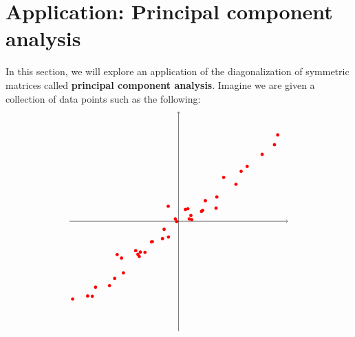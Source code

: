 \section{Application: Principal component analysis}

In this section, we will explore an application of the diagonalization
of symmetric matrices called \textbf{principal component analysis}.
Imagine we are given a collection of data points such as the
following:
\begin{equation}\label{eqn:subspace-fitting}
  \begin{tikzpicture}[baseline=-0.5ex]
    \draw[thin,->] (-4,0) -- (4,0);
    \draw[thin,->] (0,-4) -- (0,4);
    \fill[color=red] (-2.25,-1.21) circle (0.06);
    \fill[color=red] (-1.44,-1.28) circle (0.06);
    \fill[color=red] (2.29,1.82) circle (0.06);
    \fill[color=red] (0.25,0.43) circle (0.06);
    \fill[color=red] (-1.57,-1.07) circle (0.06);
    \fill[color=red] (2.51,2.00) circle (0.06);
    \fill[color=red] (-2.53,-2.34) circle (0.06);
    \fill[color=red] (-3.04,-2.40) circle (0.06);
    \fill[color=red] (0.84,0.36) circle (0.06);
    \fill[color=red] (-3.16,-2.73) circle (0.06);
    \fill[color=red] (-2.02,-1.88) circle (0.06);
    \fill[color=red] (3.06,2.44) circle (0.06);
    \fill[color=red] (-1.40,-1.12) circle (0.06);
    \fill[color=red] (-2.09,-1.34) circle (0.06);
    \fill[color=red] (-1.23,-1.13) circle (0.06);
    \fill[color=red] (0.48,0.06) circle (0.06);
    \fill[color=red] (-1.49,-1.20) circle (0.06);
    \fill[color=red] (0.98,0.75) circle (0.06);
    \fill[color=red] (1.40,0.89) circle (0.06);
    \fill[color=red] (-0.12,0.09) circle (0.06);
    \fill[color=red] (0.88,0.40) circle (0.06);
    \fill[color=red] (-0.38,0.55) circle (0.06);
    \fill[color=red] (0.34,0.46) circle (0.06);
    \fill[color=red] (0.45,0.21) circle (0.06);
    \fill[color=red] (-0.59,-0.63) circle (0.06);
    \fill[color=red] (-0.53,-0.29) circle (0.06);
    \fill[color=red] (2.10,1.35) circle (0.06);
    \fill[color=red] (1.65,1.60) circle (0.06);
    \fill[color=red] (-3.88,-2.83) circle (0.06);
    \fill[color=red] (-0.07,-0.01) circle (0.06);
    \fill[color=red] (-0.37,-0.57) circle (0.06);
    \fill[color=red] (-0.99,-0.75) circle (0.06);
    \fill[color=red] (-2.34,-2.08) circle (0.06);
    \fill[color=red] (3.63,3.15) circle (0.06);
    \fill[color=red] (1.37,0.48) circle (0.06);
    \fill[color=red] (-0.96,-0.74) circle (0.06);
    \fill[color=red] (3.51,2.79) circle (0.06);
    \fill[color=red] (-3.33,-2.72) circle (0.06);
    \fill[color=red] (0.39,0.09) circle (0.06);

\end{tikzpicture}
\end{equation}
